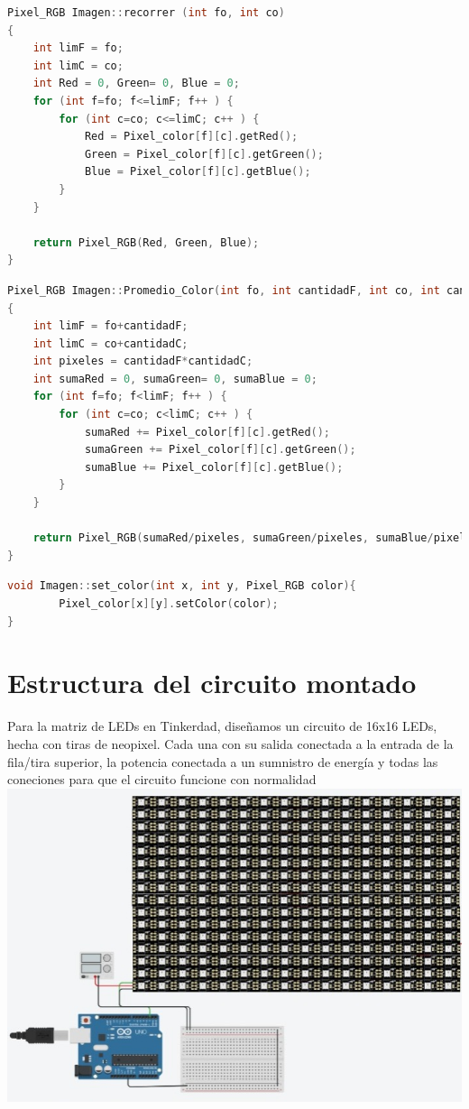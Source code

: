 \documentclass{article}
\begin{document}
\newpage
\begin{lstlisting}[language=C++, caption=Clase recorrer]
Pixel_RGB Imagen::recorrer (int fo, int co)
{
    int limF = fo;
    int limC = co;
    int Red = 0, Green= 0, Blue = 0;
    for (int f=fo; f<=limF; f++ ) {
        for (int c=co; c<=limC; c++ ) {
            Red = Pixel_color[f][c].getRed();
            Green = Pixel_color[f][c].getGreen();
            Blue = Pixel_color[f][c].getBlue();
        }
    }

    return Pixel_RGB(Red, Green, Blue);
}
\end{lstlisting}
\vspace{1,5cm}
\begin{lstlisting}[language=C++, caption=Clase promedio color]
Pixel_RGB Imagen::Promedio_Color(int fo, int cantidadF, int co, int cantidadC)
{
    int limF = fo+cantidadF;
    int limC = co+cantidadC;
    int pixeles = cantidadF*cantidadC;
    int sumaRed = 0, sumaGreen= 0, sumaBlue = 0;
    for (int f=fo; f<limF; f++ ) {
        for (int c=co; c<limC; c++ ) {
            sumaRed += Pixel_color[f][c].getRed();
            sumaGreen += Pixel_color[f][c].getGreen();
            sumaBlue += Pixel_color[f][c].getBlue();
        }
    }

    return Pixel_RGB(sumaRed/pixeles, sumaGreen/pixeles, sumaBlue/pixeles);
}
\end{lstlisting}
\vspace{1,5cm}

\begin{lstlisting}[language=C++, caption=Clase set color]
void Imagen::set_color(int x, int y, Pixel_RGB color){
        Pixel_color[x][y].setColor(color);
}
\end{lstlisting}
\section{Estructura del circuito montado}
Para la matriz de LEDs en Tinkerdad, diseñamos un circuito de 16x16 LEDs, hecha con tiras de neopixel. Cada una con su salida conectada a la entrada de la fila/tira superior, la potencia conectada a un sumnistro de energía y todas las coneciones para que el circuito funcione con normalidad\\

\includegraphics[width=14cm]{Imagenes/circuito.jpeg}
\end{document}
